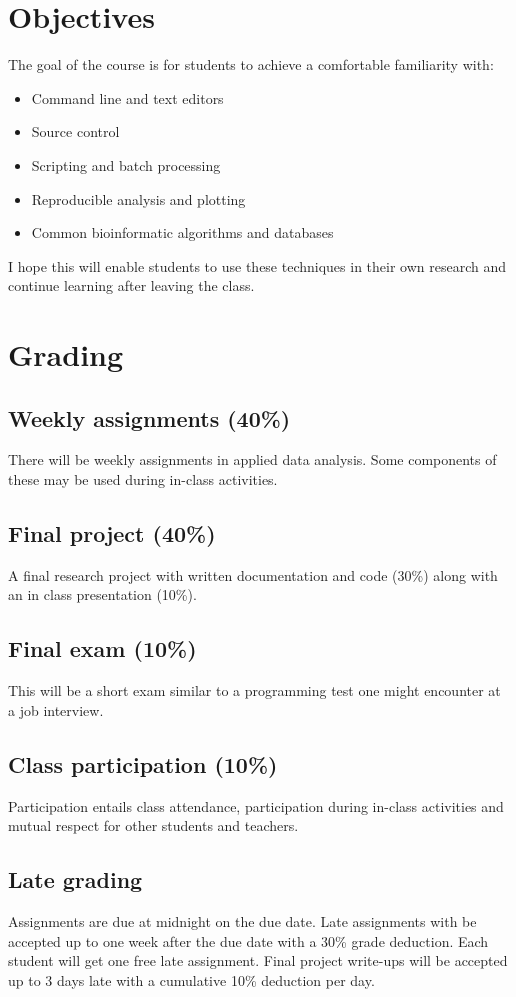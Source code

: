 \documentclass[12pt]{article}
\begin{document}
\section*{Objectives}
The goal of the course is for students to achieve a comfortable familiarity with:
\begin{itemize}
	\item Command line and text editors
	\item Source control
	\item Scripting and batch processing
	\item Reproducible analysis and plotting 
	\item Common bioinformatic algorithms and databases
\end{itemize}
I hope this will enable students to use these techniques in their own research and continue learning after leaving the class.

\section*{Grading}
\subsection*{Weekly assignments (40\%)}
There will be weekly assignments in applied data analysis. Some components of these may be used during in-class activities.
\subsection*{Final project (40\%)}
A final research project with written documentation and code (30\%) along with an in class presentation (10\%).
\subsection*{Final exam (10\%)}
This will be a short exam similar to a programming test one might encounter at a job interview.
\subsection*{Class participation (10\%)}
Participation entails class attendance, participation during in-class activities and mutual respect for other students and teachers.

\subsection*{Late grading}
Assignments are due at midnight on the due date. Late assignments with be accepted up to one week after the due date with a 30\% grade deduction. Each student will get one free late assignment. Final project write-ups will be accepted up to 3 days late with a cumulative 10\% deduction per day.
\end{document}
